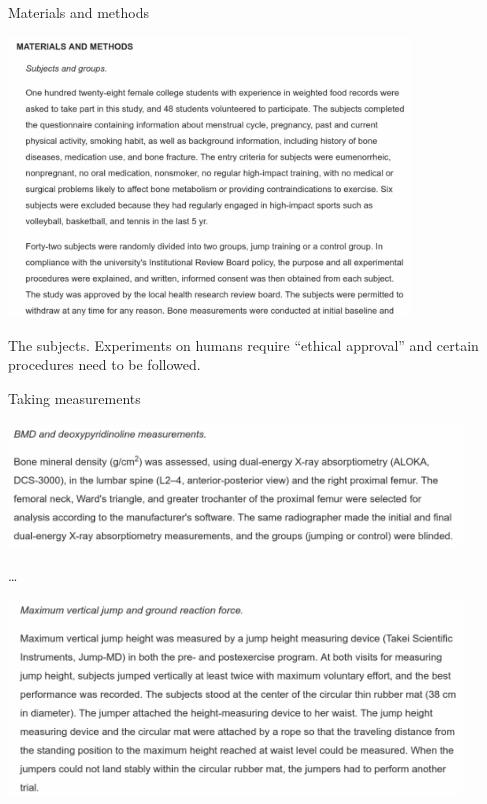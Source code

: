 \documentclass[unknownkeysallowed]{beamer}\usepackage[]{graphicx}\usepackage[]{color}
\begin{document}
\begin{frame}[fragile]{Materials and methods}
  
\includegraphics[width=0.8\textwidth]{matmeth}  

The subjects. Experiments on humans require ``ethical approval'' and
certain procedures need to be followed.
  
\end{frame}

\begin{frame}[fragile]{Taking measurements}
  
\includegraphics[width=0.9\textwidth]{measurements}

\ldots

\includegraphics[width=0.9\textwidth]{measurementb}  
  
\end{frame}
\end{document}
